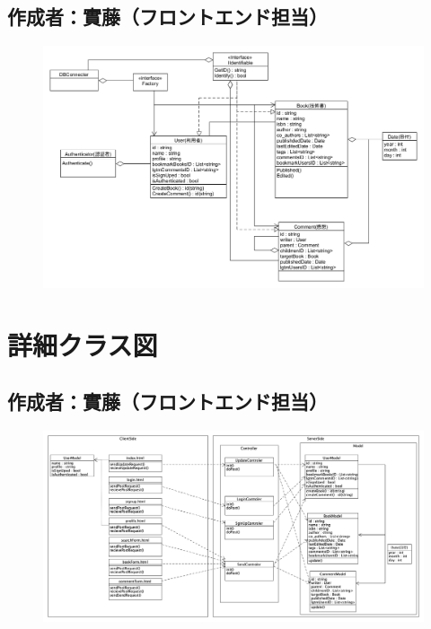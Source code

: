 \documentclass[dvipdfmx]{jsarticle}
\begin{document}
    \subsection*{\rm{作成者：實藤（フロントエンド担当）}}
    \begin{figure}[H]
        \begin{center}
            \includegraphics[scale=0.4,clip]{pictures/SysPro-ModelClassImage.png}
        \end{center}
    \end{figure}

    \newpage

    \section*{詳細クラス図}
    \subsection*{\rm{作成者：實藤（フロントエンド担当）}}
    \begin{figure}[H]
        \begin{center}
            \includegraphics[scale=0.3,clip]{pictures/MVC.png}
        \end{center}
    \end{figure}
\end{document}
